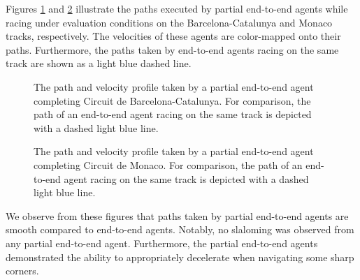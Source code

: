 Figures \ref{fig:esp_eval} and \ref{fig:mco_eval} illustrate the paths executed by partial end-to-end agents while racing under evaluation conditions on the Barcelona-Catalunya and Monaco tracks, respectively.
The velocities of these agents are color-mapped onto their paths.
Furthermore, the paths taken by end-to-end agents racing on the same track are shown as a light blue dashed line.
\begin{figure}[htb!]
    \centering
    
    \caption[The path and velocity profile taken by a partial end-to-end agent completing Circuit de Barcelona-Catalunya]{The path and velocity profile taken by a partial end-to-end agent completing Circuit de Barcelona-Catalunya. For comparison, the path of an end-to-end agent racing on the same track is depicted with a dashed light blue line.}
    \label{fig:esp_eval}
\end{figure}
\begin{figure}[htb!]
    \centering
    
    \caption[The path and velocity profile taken by a partial end-to-end agent completing Circuit de Monaco]{The path and velocity profile taken by a partial end-to-end agent completing Circuit de Monaco. For comparison, the path of an end-to-end agent racing on the same track is depicted with a dashed light blue line.}
    \label{fig:mco_eval}
\end{figure}
We observe from these figures that paths taken by partial end-to-end agents are smooth compared to end-to-end agents.
Notably, no slaloming was observed from any partial end-to-end agent.
Furthermore, the partial end-to-end agents demonstrated the ability to appropriately decelerate when navigating some sharp corners.

%     

%     



